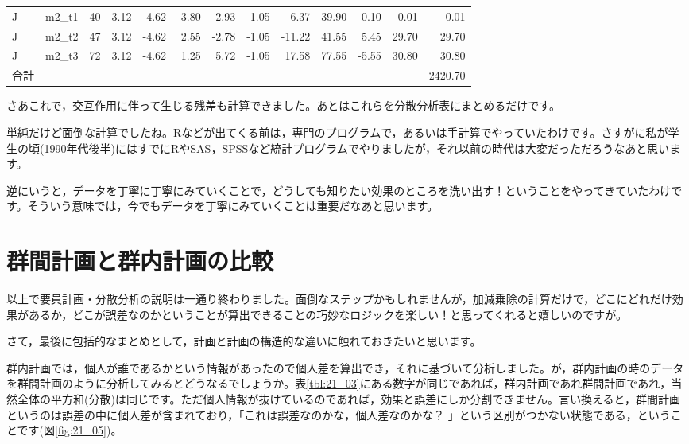 \documentclass{ltjbook}
\begin{document}
\begin{table}[p]
\begin{tabular}{llrrrrrrrrrrr}
J & m2\_t1 & 40 & 3.12 & -4.62 & -3.80 & -2.93 & -1.05 & -6.37 & 39.90 & 0.10 & 0.01 & 0.01 \\
J & m2\_t2 & 47 & 3.12 & -4.62 & 2.55 & -2.78 & -1.05 & -11.22 & 41.55 & 5.45 & 29.70 & 29.70 \\
J & m2\_t3 & 72 & 3.12 & -4.62 & 1.25 & 5.72 & -1.05 & 17.58 & 77.55 & -5.55 & 30.80 & 30.80 \\
  \hline
  合計 &  &  &  &  &  &  &  &  &  &  &  & 2420.70 \\
   \hline
\end{tabular}
\end{table}

さあこれで，交互作用に伴って生じる残差も計算できました。あとはこれらを分散分析表にまとめるだけです。

単純だけど面倒な計算でしたね。Rなどが出てくる前は，専門のプログラムで，あるいは手計算でやっていたわけです。さすがに私が学生の頃(1990年代後半)にはすでにRやSAS，SPSSなど統計プログラムでやりましたが，それ以前の時代は大変だっただろうなあと思います。

逆にいうと，データを丁寧に丁寧にみていくことで，どうしても知りたい効果のところを洗い出す！ということをやってきていたわけです。そういう意味では，今でもデータを丁寧にみていくことは重要だなあと思います。



\section{群間計画と群内計画の比較}

以上で要員計画・分散分析の説明は一通り終わりました。面倒なステップかもしれませんが，加減乗除の計算だけで，どこにどれだけ効果があるか，どこが誤差なのかということが算出できることの巧妙なロジックを楽しい！と思ってくれると嬉しいのですが。

さて，最後に包括的なまとめとして，計画と計画の構造的な違いに触れておきたいと思います。

群内計画では，個人が誰であるかという情報があったので個人差を算出でき，それに基づいて分析しました。が，群内計画の時のデータを群間計画のように分析してみるとどうなるでしょうか。表\ref{tbl:21_03}にある数字が同じであれば，群内計画であれ群間計画であれ，当然全体の平方和(分散)は同じです。ただ個人情報が抜けているのであれば，効果と誤差にしか分割できません。言い換えると，群間計画というのは誤差の中に個人差が含まれており，「これは誤差なのかな，個人差なのかな？ 」という区別がつかない状態である，ということです(図\ref{fig:21_05})。
\end{document}
